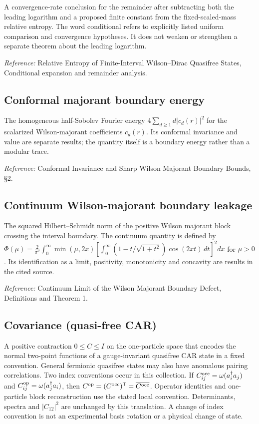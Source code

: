 \documentclass[
  10pt,
  a4paper,
]{article}
\begin{document}
A convergence-rate conclusion for the remainder after subtracting both the leading logarithm and a proposed finite constant from the fixed-scaled-mass relative entropy. The word conditional refers to explicitly listed uniform comparison and convergence hypotheses. It does not weaken or strengthen a separate theorem about the leading logarithm.

\nopagebreak[4]

\emph{Reference:} Relative Entropy of Finite-Interval Wilson--Dirac Quasifree States, Conditional expansion and remainder analysis.

\subsection{Conformal majorant boundary energy}\label{conformal-majorant-boundary-energy}

The homogeneous half-Sobolev Fourier energy \(4\sum_{d\ge1}d|c_d(r)|^2\) for the scalarized Wilson-majorant coefficients \(c_d(r)\). Its conformal invariance and value are separate results; the quantity itself is a boundary energy rather than a modular trace.

\nopagebreak[4]

\emph{Reference:} Conformal Invariance and Sharp Wilson Majorant Boundary Bounds, §2.

\subsection{Continuum Wilson-majorant boundary leakage}\label{continuum-wilson-majorant-boundary-leakage}

The squared Hilbert--Schmidt norm of the positive Wilson majorant block crossing the interval boundary. The continuum quantity is defined by \(\Phi(\mu)=\frac{2}{\pi^2}\int_0^\infty\min(\mu,2x)[\int_0^\infty(1-t/\sqrt{1+t^2})\cos(2xt)\,dt]^2dx\) for \(\mu>0\). Its identification as a limit, positivity, monotonicity and concavity are results in the cited source.

\nopagebreak[4]

\emph{Reference:} Continuum Limit of the Wilson Majorant Boundary Defect, Definitions and Theorem 1.

\subsection{Covariance (quasi-free CAR)}\label{covariance-quasi-free-car}

A positive contraction \(0\le C\le I\) on the one-particle space that encodes the normal two-point functions of a gauge-invariant quasifree CAR state in a fixed convention. General fermionic quasifree states may also have anomalous pairing correlations. Two index conventions occur in this collection. If \(C^{\rm occ}_{ij}=\omega(a_i^\dagger a_j)\) and \(C^{\rm op}_{ij}=\omega(a_j^\dagger a_i)\), then \(C^{\rm op}=(C^{\rm occ})^{\mathsf T}=\overline{C^{\rm occ}}\). Operator identities and one-particle block reconstruction use the stated local convention. Determinants, spectra and \(|C_{12}|^2\) are unchanged by this translation. A change of index convention is not an experimental basis rotation or a physical change of state.
\end{document}
